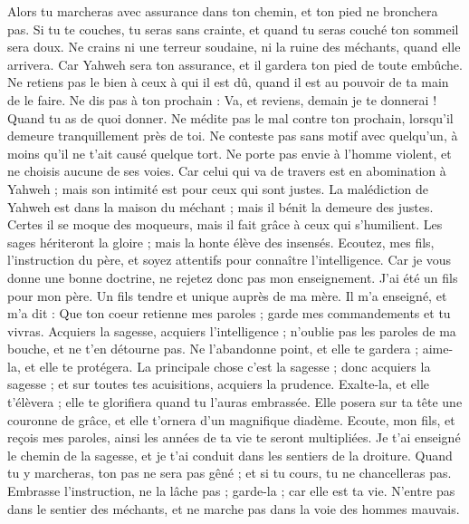 \begin{multicols}{2}
Alors tu marcheras avec assurance dans ton chemin, et ton pied ne bronchera pas.
Si tu te couches, tu seras sans crainte, et quand tu seras couché ton sommeil sera doux.
Ne crains ni une terreur soudaine, ni la ruine des méchants, quand elle arrivera.
Car Yahweh sera ton assurance, et il gardera ton pied de toute embûche.
Ne retiens pas le bien à ceux à qui il est dû, quand il est au pouvoir de ta main de le faire.
Ne dis pas à ton prochain : Va, et reviens, demain je te donnerai ! Quand tu as de quoi donner.
Ne médite pas le mal contre ton prochain, lorsqu'il demeure tranquillement près de toi.
Ne conteste pas sans motif avec quelqu'un, à moins qu'il ne t'ait causé quelque tort.
Ne porte pas envie à l'homme violent, et ne choisis aucune de ses voies.
Car celui qui va de travers est en abomination à Yahweh ; mais son intimité est pour ceux qui sont justes.
La malédiction de Yahweh est dans la maison du méchant ; mais il bénit la demeure des justes.
Certes il se moque des moqueurs, mais il fait grâce à ceux qui s'humilient.
Les sages hériteront la gloire ; mais la honte élève des insensés.
\VerseOne{}Ecoutez, mes fils, l'instruction du père, et soyez attentifs pour connaître l'intelligence.
Car je vous donne une bonne doctrine, ne rejetez donc pas mon enseignement.
J'ai été un fils pour mon père. Un fils tendre et unique auprès de ma mère.
Il m'a enseigné, et m'a dit : Que ton coeur retienne mes paroles ; garde mes commandements et tu vivras.
Acquiers la sagesse, acquiers l'intelligence ; n'oublie pas les paroles de ma bouche, et ne t'en détourne pas.
Ne l'abandonne point, et elle te gardera ; aime-la, et elle te protégera.
La principale chose c'est la sagesse ; donc acquiers la sagesse ; et sur toutes tes acuisitions, acquiers la prudence.
Exalte-la, et elle t'élèvera ; elle te glorifiera quand tu l'auras embrassée.
Elle posera sur ta tête une couronne de grâce, et elle t'ornera d'un magnifique diadème.
Ecoute, mon fils, et reçois mes paroles, ainsi les années de ta vie te seront multipliées.
Je t'ai enseigné le chemin de la sagesse, et je t'ai conduit dans les sentiers de la droiture.
Quand tu y marcheras, ton pas ne sera pas gêné ; et si tu cours, tu ne chancelleras pas.
Embrasse l'instruction, ne la lâche pas ; garde-la ; car elle est ta vie.
N'entre pas dans le sentier des méchants, et ne marche pas dans la voie des hommes mauvais.

\end{multicols}
